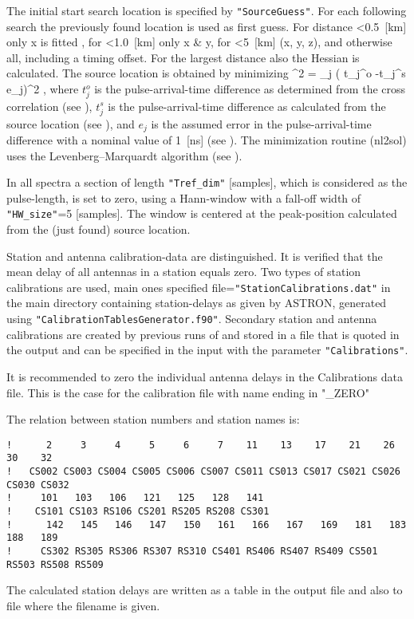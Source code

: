 The initial start search location is specified by \verb!"SourceGuess"!. For each following search the previously found location is used as first guess. For distance \textless 0.5~[km] only x is fitted , for \textless 1.0~[km] only x \& y, for \textless 5~[km] (x, y, z), and otherwise all, including a timing offset. For the largest distance also the Hessian is calculated.
The source location is obtained by minimizing
\beq
\chi^2 = \sum_{j} \left( {\delta t_j^o -\delta t_j^s \over e_j}\right)^2 \;,
\eeq
where $t_j^o$ is the pulse-arrival-time difference as determined from the cross correlation (see ), $t_j^s$ is the pulse-arrival-time difference as calculated from the source location (see ), and $e_j$ is the assumed error in the pulse-arrival-time difference with a nominal value of 1~[ns] (see ). The minimization routine (nl2sol) uses the Levenberg--Marquardt algorithm (see ).

In all spectra a section of length \verb!"Tref_dim"! [samples], which is considered as the pulse-length, is set to zero, using a Hann-window with a fall-off width of \verb!"HW_size"!=5 [samples]. The window is centered at the peak-position calculated from the (just found) source location.





Station and antenna calibration-data are distinguished. It is verified that the mean delay of all antennas in a station equals zero. Two types of station calibrations are used, main ones specified file=\verb!"StationCalibrations.dat"! in the main directory containing station-delays as given by ASTRON, generated using \verb!"CalibrationTablesGenerator.f90"!. Secondary station and antenna calibrations are created by previous runs of  and stored in a file that is quoted in the output and can be specified in the input with the parameter \verb!"Calibrations"!.

It is recommended to zero the individual antenna delays in the Calibrations data file. This is the case for the calibration file with name ending in "\_ZERO"

The relation between station numbers and station names is:

\begin{linenumbers}
\begin{verbatim}
!      2     3     4     5     6     7    11    13    17    21    26    30    32
!   CS002 CS003 CS004 CS005 CS006 CS007 CS011 CS013 CS017 CS021 CS026 CS030 CS032
!     101   103   106   121   125   128   141
!    CS101 CS103 RS106 CS201 RS205 RS208 CS301
!      142   145   146   147   150   161   166   167   169   181   183   188   189
!     CS302 RS305 RS306 RS307 RS310 CS401 RS406 RS407 RS409 CS501 RS503 RS508 RS509
\end{verbatim}
\end{linenumbers}

The calculated station delays are written as a table in the output file and also to file where the filename is given.





